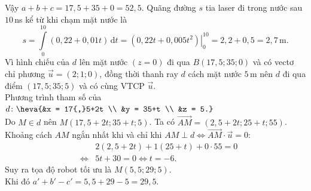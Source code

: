 \begin{ex}
{\begin{itemchoice}
			Vậy $a+b+c = 17{,}5 + 35 + 0 = 52{,}5$.
			\itemch Quãng đường $s$ tia laser đi trong nước sau $10\,$ns kể từ khi chạm mặt nước là
			\[s = \displaystyle\int\limits_0^{10} (0{,}22+0{,}01t) \mathrm{\,d}t = \left. \left( 0{,}22t + 0{,}005t^2 \right) \right|_0^{10} = 2{,}2 + 0{,}5 = 2{,}7\,\text{m}.\]
			\itemch Vì hình chiếu của $d$ lên mặt nước $(z=0)$ đi qua $B(17{,}5;35;0)$ và có vectơ chỉ phương $\vec{u} = (2;1;0)$, đồng thời thanh ray $d$ cách mặt nước $5\,$m nên $d$ đi qua điểm $(17{,}5;35;5)$ và có cùng VTCP $\vec{u}$. \\
			Phương trình tham số của $d \colon \heva{&x = 17{,}5+2t \\ &y = 35+t \\ &z = 5.}$ \\
			Do $M \in d$ nên $M(17{,}5+2t; 35+t; 5)$. Ta có $\overrightarrow{AM} = (2{,}5+2t; 25+t; 55)$. \\
			Khoảng cách $AM$ ngắn nhất khi và chỉ khi $AM \perp d \Leftrightarrow \overrightarrow{AM} \cdot \vec{u} = 0$:
			\begin{eqnarray*}
				&& 2(2{,}5+2t) + 1(25+t) + 0 \cdot 55 = 0 \\
				&\Leftrightarrow& 5t + 30 = 0 \Leftrightarrow t = -6.
			\end{eqnarray*}
			Suy ra tọa độ robot tối ưu là $M(5{,}5; 29; 5)$. \\
			Khi đó $a'+b'-c' = 5{,}5 + 29 - 5 = 29{,}5$.
		\end{itemchoice}
	}
\end{ex}

